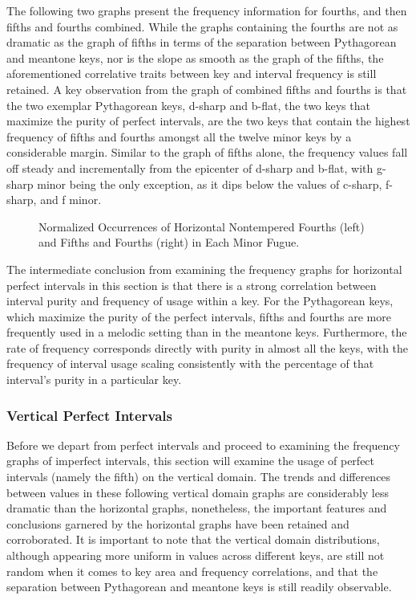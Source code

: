 The following two graphs present the frequency information for fourths,
and then fifths and fourths combined. While the graphs containing the
fourths are not as dramatic as the graph of fifths in terms of the
separation between Pythagorean and meantone keys, nor is the slope as
smooth as the graph of the fifths, the aforementioned correlative traits
between key and interval frequency is still retained. A key observation
from the graph of combined fifths and fourths is that the two exemplar
Pythagorean keys, d-sharp and b-flat, the two keys that maximize the
purity of perfect intervals, are the two keys that contain the highest
frequency of fifths and fourths amongst all the twelve minor keys by a
considerable margin. Similar to the graph of fifths alone, the frequency
values fall off steady and incrementally from the epicenter of d-sharp
and b-flat, with g-sharp minor being the only exception, as it dips
below the values of c-sharp, f-sharp, and f minor.



\begin{figure}[H]
\vspace{1.5em}
    \centering
    \caption[Normalized Occurrences of Horizontal Nontempered Fifths and Fourths in Each Minor Fugue. ]{Normalized Occurrences of Horizontal Nontempered Fourths (left) and Fifths and Fourths (right) in Each Minor Fugue.}
\end{figure}    The intermediate conclusion from examining the frequency graphs for
horizontal perfect intervals in this section is that there is a strong
correlation between interval purity and frequency of usage within a key.
For the Pythagorean keys, which maximize the purity of the perfect
intervals, fifths and fourths are more frequently used in a melodic
setting than in the meantone keys. Furthermore, the rate of frequency
corresponds directly with purity in almost all the keys, with the
frequency of interval usage scaling consistently with the percentage of
that interval's purity in a particular key.

    \subsubsection{Vertical Perfect
Intervals}\label{vertical-perfect-intervals}

Before we depart from perfect intervals and proceed to examining the
frequency graphs of imperfect intervals, this section will examine the
usage of perfect intervals (namely the fifth) on the vertical domain.
The trends and differences between values in these following vertical
domain graphs are considerably less dramatic than the horizontal graphs,
nonetheless, the important features and conclusions garnered by the
horizontal graphs have been retained and corroborated. It is important
to note that the vertical domain distributions, although appearing more
uniform in values across different keys, are still not random when it
comes to key area and frequency correlations, and that the separation
between Pythagorean and meantone keys is still readily observable.

